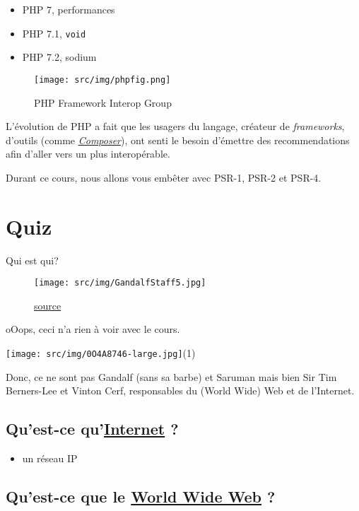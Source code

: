 \begin{itemize}
\tightlist
\item
  PHP 7, performances
\item
  PHP 7.1, \textenglish{\texttt{void}}
\item
  PHP 7.2, sodium
\end{itemize}

\begin{figure}
\centering
\texttt{[image: src/img/phpfig.png]}
\caption{PHP Framework Interop Group}
\end{figure}

L'évolution de PHP a fait que les usagers du langage, créateur de
\emph{frameworks}, d'outils (comme
\href{http://getcomposer.org/}{\emph{Composer}}), ont senti le besoin
d'émettre des recommendations afin d'aller vers un plus interopérable.

Durant ce cours, nous allons vous embêter avec PSR-1, PSR-2 et PSR-4.

\hypertarget{quiz}{%
\section{Quiz}\label{quiz}}

Qui est qui?

\begin{figure}
\centering
\texttt{[image: src/img/GandalfStaff5.jpg]}
\caption{\href{http://hero.wikia.com/wiki/Gandalf}{source}}
\end{figure}

oOops, ceci n'a rien à voir avec le cours.

\texttt{[image: src/img/0O4A8746-large.jpg]}(1)

Donc, ce ne sont pas Gandalf (sans sa barbe) et Saruman mais bien Sir
Tim Berners-Lee et Vinton Cerf, responsables du (World Wide) Web et de
l'Internet.

\hypertarget{quest-ce-quinternetitcrowd}{%
\subsection{\texorpdfstring{Qu'est-ce
qu'\href{https://www.youtube.com/watch?v=iDbyYGrswtg}{Internet}
?}{Qu'est-ce qu'Internet ?}}\label{quest-ce-quinternetitcrowd}}

\begin{itemize}
\tightlist
\item
  un réseau IP
\end{itemize}

\hypertarget{quest-ce-que-le-world-wide-webcern}{%
\subsection{\texorpdfstring{Qu'est-ce que le
\href{http://line-mode.cern.ch/www/hypertext/WWW/TheProject.html\%5E}{World
Wide Web}
?}{Qu'est-ce que le World Wide Web ?}}\label{quest-ce-que-le-world-wide-webcern}}

